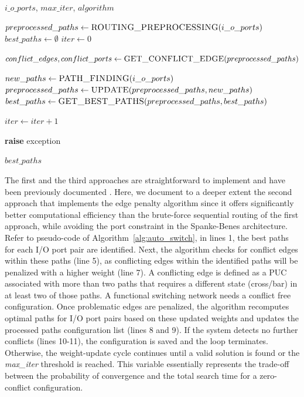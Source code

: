 \begin{algorithm}[h]
    \footnotesize
    \caption{OCS Auto Switch}
    \label{alg:auto_switch}
    \begin{algorithmic}[1]
        \Require $i\_o\_ports$, $\mathit{max\_iter}$, $\mathit{algorithm}$

        \State $preprocessed\_paths \gets \Call{ROUTING\_PREPROCESSING}{i\_o\_ports}$
        \State $best\_paths \gets \emptyset$
        \State $iter \gets 0$

        \State $conflict\_edges, conflict\_ports \gets \Call{GET\_CONFLICT\_EDGE}{preprocessed\_paths}$

        \State {}
        \State $new\_paths \gets \Call{PATH\_FINDING}{i\_o\_ports}$
        \State $preprocessed\_paths \gets \Call{UPDATE}{preprocessed\_paths, new\_paths}$
        \Else
        \State $best\_paths \gets \Call{GET\_BEST\_PATHS}{preprocessed\_paths, best\_paths}$
        \EndIf

        \State $iter \gets iter + 1$
        \EndWhile


        \State \textbf{raise} exception
        \EndIf

        \State \Return $best\_paths$
    \end{algorithmic}
\end{algorithm}

The first and the third approaches are straightforward to implement and have been previously documented \cite{lopez2020auto, jia2018six}.
Here, we document to a deeper extent the second approach that implements the edge penalty algorithm since it offers significantly better
computational efficiency than the brute-force sequential routing of the first approach, while avoiding the port constraint in the Spanke-Benes architecture.
Refer to pseudo-code of Algorithm~\ref{alg:auto_switch}, in lines 1, the best paths for each I/O port pair are identified.
Next, the algorithm checks for conflict edges within these paths (line 5), as conflicting edges within the identified paths will be penalized
with a higher weight (line 7). A conflicting edge is defined as a PUC associated with more than two paths that requires a different state (cross/bar)
in at least two of those paths. A functional switching network needs a conflict free configuration.
Once problematic edges are penalized, the algorithm recomputes optimal paths for I/O port pairs based on these updated weights and updates the
processed paths configuration list (lines 8 and 9). If the system detects no further conflicts (lines 10-11), the configuration
is saved and the loop terminates. Otherwise, the weight-update cycle continues until a valid solution is found or the \textit{max\_iter} threshold is reached.
This variable essentially represents the trade-off between the probability of convergence and the total search time for a zero-conflict configuration.

